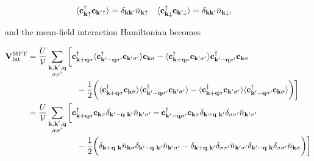 \documentclass{homework}
\begin{document}
\begin{align}
    \langle {\bf c}_{{\bf k}\uparrow}^\dagger {\bf c}_{{\bf k}'\uparrow} \rangle &= \delta_{{\bf k} {\bf k}'} \bar{n}_{{\bf k} \uparrow} & \langle {\bf c}_{{\bf k}\downarrow}^\dagger {\bf c}_{{\bf k}'\downarrow} \rangle &= \delta_{{\bf k} {\bf k}'} \bar{n}_{{\bf k} \downarrow}, 
\end{align}

and the mean-field interaction Hamiltonian becomes 

\begin{align*}
    {\bf V}_{\textnormal{int}}^{\textnormal{MFT}} &= \frac{U}{\mathcal{V}} \sum_{\substack{{\bf k}, {\bf k}', {\bf q} \\
          {\sigma \sigma'}}} \bigg[ {\bf c}_{{\bf k + q}\sigma}^\dagger \langle {\bf c}_{{\bf k'-q}\sigma'}^\dagger {\bf c}_{{\bf k}'\sigma'} \rangle {\bf c}_{{\bf k}\sigma} - \langle {\bf c}_{{\bf k + q}\sigma}^\dagger {\bf c}_{{\bf k}'\sigma'} \rangle {\bf c}_{{\bf k'-q}\sigma'}^\dagger {\bf c}_{{\bf k}\sigma}  \\
          &  \blanky \blanky \blanky \blanky \blanky \blanky \blanky \blanky \blanky \blanky \blanky \blanky \blanky \blanky \blanky \blanky \blanky \blanky   -\frac{1}{2} \bigg( \langle {\bf c}_{{\bf k + q}\sigma}^\dagger {\bf c}_{{\bf k}\sigma} \rangle \langle {\bf c}_{{\bf k' - q}\sigma'}^\dagger {\bf c}_{{\bf k}'\sigma'} \rangle - \langle {\bf c}_{{\bf k + q}\sigma}^\dagger {\bf c}_{{\bf k}'\sigma'} \rangle \langle {\bf c}_{{\bf k' - q}\sigma'}^\dagger {\bf c}_{{\bf k}\sigma} \rangle  \bigg)  \bigg] \\
          &= \frac{U}{\mathcal{V}} \sum_{\substack{{\bf k}, {\bf k}', {\bf q} \\
          {\sigma \sigma'}}} 
          \bigg[ {\bf c}_{{\bf k + q}\sigma}^\dagger {\bf c}_{{\bf k}\sigma} \delta_{{\bf k'-q} \blanky {\bf k}'} \bar{n}_{{\bf k'} \sigma'} - {\bf c}_{{\bf k'-q}\sigma'}^\dagger {\bf c}_{{\bf k}\sigma} \delta_{{\bf k+q} \blanky {\bf k}'} \delta_{\sigma \sigma'} \bar{n}_{{\bf k}' \sigma'} \\
          & \blanky \blanky \blanky \blanky \blanky \blanky \blanky \blanky \blanky \blanky \blanky \blanky \blanky \blanky \blanky \blanky \blanky \blanky  - \frac{1}{2} \bigg(\delta_{{\bf k+q} \blanky {\bf k}} \bar{n}_{{\bf k} \sigma} \delta_{{\bf k'-q} \blanky {\bf k}'} \bar{n}_{{\bf k}' \sigma'} - \delta_{{\bf k+q} \blanky {\bf k}'} \delta_{\sigma \sigma'} \bar{n}_{{\bf k}' \sigma'} \delta_{{\bf k'-q} \blanky {\bf k}} \delta_{\sigma \sigma'} \bar{n}_{{\bf k} \sigma} \bigg) \bigg] \\

\end{align*}
\end{document}

